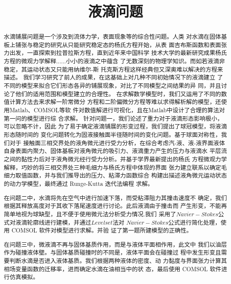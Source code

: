 \documentclass{cumcmthesis}
\title{液滴问题}\tihao{A}
\begin{document}
\maketitle

\begin{abstract}    水滴铺展问题是一个涉及到流体力学，表面现象等的综合性问题。人类
    对水滴在固体基板上铺张与稳定的研究从只能研究稳定态的杨氏方程开始，从表
    面吉布斯函数和表面张力出发，一直探索到拉普拉斯方程，直到近年来中国科学
    技术大学的最新研究成果杨氏方程的微观力学解释......小小的液滴之中蕴含
    了无数深刻的物理学知识。而如若液滴非稳定，其运动状态又只能用纳维尔-斯
    托克斯方程这样经典但又深奥难以解决的方程来描述。 
    我们学习研究了前人的成果，在这基础上对几种不同初始情况下的液滴建立
    了不同的模型来拟合它们形态各异的铺展现象，对比了不同模型之间结果的异
    同，并且讨论了他们的适用范围和模型建立的合理性。 
    在求解数学模型时，我们又运用了不同的数值计算方法去来求解一阶常微分
    方程和二阶偏微分方程等难以求得解析解的模型，还使用Matlab、COMSOL等软
    件对数值解进行可视化，且在Matlab中设计了合理的算法对第一问的模型进行综
    合求解。 
    \cite{黄鹏2015福建省土地生态安全AHP法和熵值法动态评价比较}
    针对问题一，我们论述了重力对于液滴形态影响极小，可以忽略不计，因此
    为了易于确定液滴铺展的形变过程，我们提出了球冠模型，将液滴形态随时间的
    变化问题转化为固液接触面半径随时间的变化问题。基于球面对称性，我们对于
    接触面三相交界处的液角微元进行受力分析，在综合考虑汽-液、液-液界面液体
    自身表面内聚力、固体基板对液角微元的吸引力、液滴重力产生的压力与液滴水
    平层流之间的黏性力后对于液角微元经行受力分析。并基于学界最新提出的杨氏
    方程微观力学解释，巧妙的将三相交界处三种毛细力与杨氏方程中体现的界面
    张力建立联系以确定毛细力取值函数，并与我们推导出的压力、粘滞力函数综合
    构建出描述液角微元运动状态的动力学模型，最终通过 Runge-Kutta 迭代法编程
    求解。 
    
    在问题二中，水滴将先在空气中进行加速下落，而受粘滞阻力其撞击速度不
    确定，我们根据其释放高度对于其收下落尾速度进行讨论。此后液滴由于撞击而
    产生形变，不能再简单地视为球缺型，且不便于使用微元法分析受力情况.我们
    采用了$Navier-Stokes$公式对液滴轮廓线进行建模，并通过$Level set$法对
    $Navier-Stokes$公式进行简化处理，使用 COMSOL 软件对模型进行求解。并验
    证了第一题所建模型的正确性。
    
    在问题三中，微液滴不再与固体基质作用，而是与液体平面相作用，此文中
    我们以油层作为碰撞液体壁。与固体基质碰撞时的不同是，液体平面会在碰撞过
    程中发生形变且需要判断水滴是否进入液体基质。我们根据两种液体的密度、动
    力黏度与界面张力计算其相场变量函数的迁移率，进而确定水滴在油相当中的状
    态，最后使用 COMSOL 软件进行仿真模拟。
    
\end{abstract}
\end{document}
